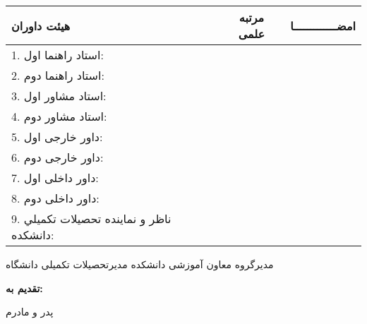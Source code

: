 \begin{center}
\begin{tabular}{| p{} | c |p{}|}
\hline
هیئت داوران & مرتبه علمی &امضـــــــــــــا\\
\hline
1. استاد راهنما اول: & & \\
2. استاد راهنما دوم: & & \\
3. استاد مشاور اول: & & \\
4. استاد مشاور دوم: & & \\
5. داور خارجی اول: & & \\
6. داور خارجی دوم: & & \\
7. داور داخلی اول: & & \\
8. داور داخلی دوم: & & \\
9. ناظر و نماينده تحصيلات تكميلي دانشكده:\newline & & \\
\hline
\end{tabular}
\end{center}

مدیرگروه 
\hspace*{2cm}
معاون آموزشی دانشکده
\hspace*{2cm}
مدیرتحصیلات تکمیلی دانشگاه
\newpage

\Esalat
\newpage




 \newpage
\thispagestyle{empty}
{\Large\bfseries تقدیم به:}\\
\vspace{3cm}
\begin{center}
{\huge\titlefont
پدر و مادرم
}
\end{center}


